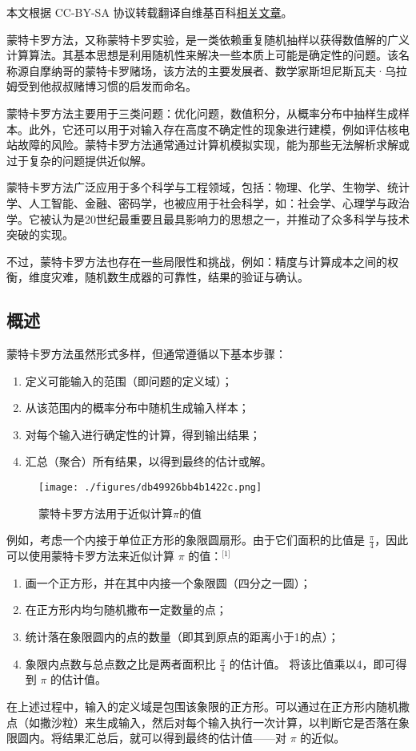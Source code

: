 
本文根据 CC-BY-SA 协议转载翻译自维基百科\href{https://en.wikipedia.org/wiki/Monte_Carlo_method}{相关文章}。

蒙特卡罗方法，又称蒙特卡罗实验，是一类依赖重复随机抽样以获得数值解的广义计算算法。其基本思想是利用随机性来解决一些本质上可能是确定性的问题。该名称源自摩纳哥的蒙特卡罗赌场，该方法的主要发展者、数学家斯坦尼斯瓦夫·乌拉姆受到他叔叔赌博习惯的启发而命名。

蒙特卡罗方法主要用于三类问题：优化问题，数值积分，从概率分布中抽样生成样本。此外，它还可以用于对输入存在高度不确定性的现象进行建模，例如评估核电站故障的风险。蒙特卡罗方法通常通过计算机模拟实现，能为那些无法解析求解或过于复杂的问题提供近似解。

蒙特卡罗方法广泛应用于多个科学与工程领域，包括：物理、化学、生物学、统计学、人工智能、金融、密码学，也被应用于社会科学，如：社会学、心理学与政治学。它被认为是20世纪最重要且最具影响力的思想之一，并推动了众多科学与技术突破的实现。

不过，蒙特卡罗方法也存在一些局限性和挑战，例如：精度与计算成本之间的权衡，维度灾难，随机数生成器的可靠性，结果的验证与确认。
\subsection{概述}
蒙特卡罗方法虽然形式多样，但通常遵循以下基本步骤：
\begin{enumerate}
\item 定义可能输入的范围（即问题的定义域）；
\item 从该范围内的概率分布中随机生成输入样本；
\item 对每个输入进行确定性的计算，得到输出结果；
\item 汇总（聚合）所有结果，以得到最终的估计或解。
\end{enumerate}
\begin{figure}[ht]
\centering
\texttt{[image: ./figures/db49926bb4b1422c.png]}
\caption{蒙特卡罗方法用于近似计算\(\pi\)的值} \label{fig_MTKL_1}
\end{figure}
例如，考虑一个内接于单位正方形的象限圆扇形。由于它们面积的比值是 $\frac{\pi}{4}$，因此可以使用蒙特卡罗方法来近似计算 $\pi$ 的值：\(^\text{[1]}\)
\begin{enumerate}
\item 画一个正方形，并在其中内接一个象限圆（四分之一圆）；
\item 在正方形内均匀随机撒布一定数量的点；
\item 统计落在象限圆内的点的数量（即其到原点的距离小于1的点）；
\item 象限内点数与总点数之比是两者面积比 $\frac{\pi}{4}$ 的估计值。
将该比值乘以4，即可得到 $\pi$ 的估计值。
\end{enumerate}
在上述过程中，输入的定义域是包围该象限的正方形。可以通过在正方形内随机撒点（如撒沙粒）来生成输入，然后对每个输入执行一次计算，以判断它是否落在象限圆内。将结果汇总后，就可以得到最终的估计值——对 $\pi$ 的近似。

